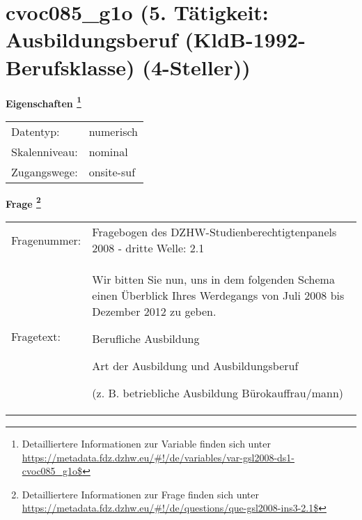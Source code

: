 
    \setcounter{footnote}{0}

    \vspace*{-1.8cm}
	\section{cvoc085\_g1o (5. Tätigkeit: Ausbildungsberuf (KldB-1992-Berufsklasse) (4-Steller))}
	\label{section:cvoc085_g1o}



    \vspace*{0.5cm}
    \noindent\textbf{Eigenschaften
	\footnote{Detailliertere Informationen zur Variable finden sich unter
		\url{https://metadata.fdz.dzhw.eu/\#!/de/variables/var-gsl2008-ds1-cvoc085_g1o$}}}\\
	\begin{tabularx}{\hsize}{@{}lX}
	Datentyp: & numerisch \\
	Skalenniveau: & nominal \\
	Zugangswege: &
	  onsite-suf
 \\
    \end{tabularx}



				\vspace*{0.5cm}
                \noindent\textbf{Frage
	                \footnote{Detailliertere Informationen zur Frage finden sich unter
		              \url{https://metadata.fdz.dzhw.eu/\#!/de/questions/que-gsl2008-ins3-2.1$}}}\\
				\begin{tabularx}{\hsize}{@{}lX}
					Fragenummer: &
					  Fragebogen des DZHW-Studienberechtigtenpanels 2008 - dritte Welle:
					  2.1
 \\
					Fragetext: & Wir bitten Sie nun, uns in dem folgenden Schema einen Überblick Ihres Werdegangs von Juli 2008 bis Dezember 2012 zu geben.\par  Berufliche Ausbildung\par  Art der Ausbildung und Ausbildungsberuf\par  (z. B. betriebliche Ausbildung Bürokauffrau/mann) \\
				\end{tabularx}





